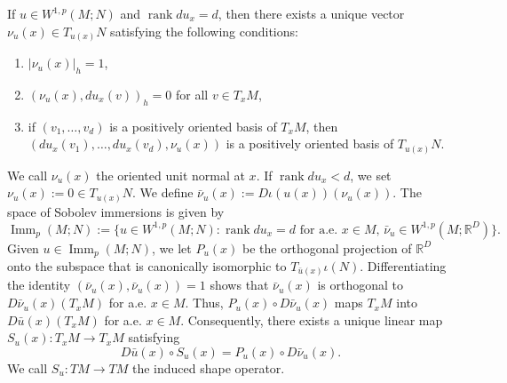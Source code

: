 \documentclass{article}
\numberwithin{equation}{section}
\theoremstyle{definition}
\theoremstyle{remark}
\DeclareMathOperator{\Imm}{Imm}
\DeclareMathOperator{\rank}{rank}
\begin{document}
If $u \in W^{1, p}(M; N)$ and $\rank du_x = d$, then there exists a unique vector $\nu_u(x) \in T_{u(x)}N$ satisfying the following conditions:
\begin{enumerate}
    \item $|\nu_u(x)|_h = 1$,
    \item $(\nu_u(x), du_x(v))_h = 0$ for all $v \in T_xM$,
    \item if $(v_1, \dots, v_d)$ is a positively oriented basis of $T_xM$, then $(du_x(v_1), \dots, du_x(v_d), \nu_u(x))$ is a positively oriented basis of $T_{u(x)}N$.
\end{enumerate}
We call $\nu_u(x)$ the oriented unit normal at $x$. If $\rank du_x < d$, we set $\nu_u(x) := 0 \in T_{u(x)}N$. We define $\bar{\nu}_u(x) := D\iota(u(x))(\nu_u(x))$. The space of Sobolev immersions is given by
\[
\Imm_p(M; N) := \{u \in W^{1, p}(M; N) : \rank du_x = d \text{ for a.e. } x \in M, \, \bar{\nu}_u \in W^{1, p}(M; \mathbb{R}^D)\}.
\]
Given $u \in \Imm_p(M; N)$, we let $P_u(x)$ be the orthogonal projection of $\mathbb{R}^D$ onto the subspace that is canonically isomorphic to $T_{\bar{u}(x)}\iota(N)$. Differentiating the identity $(\bar{\nu}_u(x), \bar{\nu}_u(x)) = 1$ shows that $\bar{\nu}_u(x)$ is orthogonal to $D\bar{\nu}_u(x)(T_xM)$ for a.e. $x \in M$. Thus, $P_u(x) \circ D\bar{\nu}_u(x)$ maps $T_xM$ into $D\bar{u}(x)(T_xM)$ for a.e. $x \in M$. Consequently, there exists a unique linear map $S_u(x) : T_xM \rightarrow T_xM$ satisfying
\begin{equation} \label{eq:compact_shape_operator}
    D\bar{u}(x) \circ S_u(x) = P_u(x) \circ D\bar{\nu}_u(x).
\end{equation}
We call $S_u : TM \rightarrow TM$ the induced shape operator.
\end{document}
